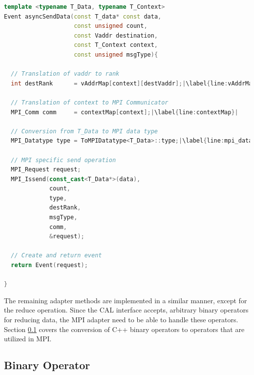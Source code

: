 \begin{lstlisting}[language=C++, breaklines=false, label={lst:adapter_send},escapechar=|]
template <typename T_Data, typename T_Context>      
Event asyncSendData(const T_data* const data, 
                    const unsigned count, 
                    const Vaddr destination, 
                    const T_Context context, 
                    const unsigned msgType){    

  // Translation of vaddr to rank
  int destRank      = vAddrMap[context][destVaddr];|\label{line:vAddrMap}|

  // Translation of context to MPI Communicator
  MPI_Comm comm     = contextMap[context];|\label{line:contextMap}|

  // Conversion from T_Data to MPI data type
  MPI_Datatype type = ToMPIDatatype<T_Data>::type;|\label{line:mpi_datatype}|

  // MPI specific send operation                                                                            
  MPI_Request request; 
  MPI_Issend(const_cast<T_Data*>(data), 
             count, 
             type,
             destRank, 
             msgType,
             comm,
             &request);

  // Create and return event
  return Event(request);                                                                                                       

}  
\end{lstlisting}

\noindent The remaining adapter methods are implemented in a similar
manner, except for the reduce operation. Since the CAL interface
accepts, arbitrary binary operators for reducing data, the MPI adapter
need to be able to handle these operators. Section
\ref{sec:bin_operator} covers the conversion of C++ binary operators
to operators that are utilized in MPI.

\subsection{Binary Operator}
\label{sec:bin_operator}

